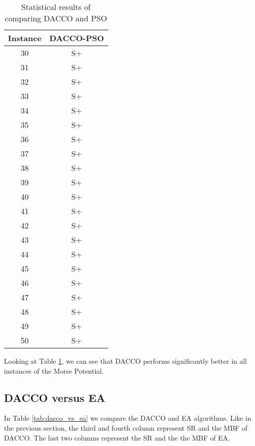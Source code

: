		\pagebreak
		\begin{table}[!htdp]
				\begin{center}
					\begin{tabular}{| c | c |}
						\hline
						\textbf{Instance} & \textbf{DACCO-PSO} \\ \hline
						30 & S+ \\ \hline
						31 & S+ \\ \hline
						32 & S+ \\ \hline
						33 & S+ \\ \hline
						34 & S+ \\ \hline
						35 & S+ \\ \hline
						36 & S+ \\ \hline
						37 & S+ \\ \hline
						38 & S+ \\ \hline
						39 & S+\\ \hline
						40 & S+\\ \hline
						41 & S+ \\ \hline
						42 & S+ \\ \hline
						43 & S+ \\ \hline
						44 & S+ \\ \hline
						45 & S+ \\ \hline
						46 & S+\\ \hline
						47 & S+ \\ \hline
						48 & S+ \\ \hline 
						49 & S+ \\ \hline
						50 & S+ \\ \hline
					\end{tabular}
					\caption{Statistical results of comparing DACCO and PSO}
					\label{tab:statistical_comparison_pso}
				\end{center}
		\end{table}
		
		Looking at Table \ref{tab:statistical_comparison_pso}, we can see that DACCO performs significantly better in all instances of the Morse Potential.
		\pagebreak
		
		\subsection{DACCO versus EA}
		
			In Table \ref{tab:dacco_vs_ea} we compare the DACCO and EA algorithms. Like in the previous section, the third and fourth column represent SR and the MBF of DACCO. The last two columns represent the SR and the the MBF of EA. 
			
